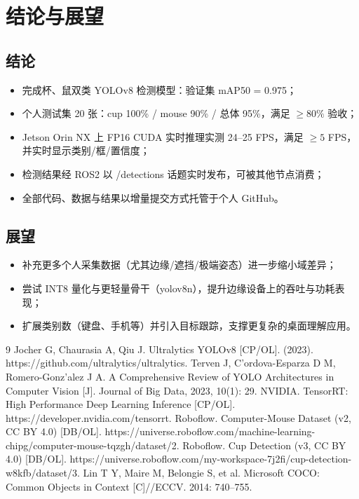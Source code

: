 \documentclass[UTF8,a4paper,zihao=-4]{ctexart}
\begin{document}
\section{结论与展望}
\subsection{结论}
\begin{itemize}
  \item 完成杯、鼠双类 YOLOv8 检测模型：验证集 mAP50 = 0.975；
  \item 个人测试集 20 张：cup 100\% / mouse 90\% / 总体 95\%，满足 $\geq 80\%$ 验收；
  \item Jetson Orin NX 上 FP16 CUDA 实时推理实测 24--25 FPS，满足 $\geq 5$ FPS，
        并实时显示类别/框/置信度；
  \item 检测结果经 ROS2 以 /detections 话题实时发布，可被其他节点消费；
  \item 全部代码、数据与结果以增量提交方式托管于个人 GitHub。
\end{itemize}
\subsection{展望}
\begin{itemize}
  \item 补充更多个人采集数据（尤其边缘/遮挡/极端姿态）进一步缩小域差异；
  \item 尝试 INT8 量化与更轻量骨干（yolov8n），提升边缘设备上的吞吐与功耗表现；
  \item 扩展类别数（键盘、手机等）并引入目标跟踪，支撑更复杂的桌面理解应用。
\end{itemize}

\begin{thebibliography}{9}
   Jocher G, Chaurasia A, Qiu J. Ultralytics YOLOv8
    [CP/OL]. (2023). https://github.com/ultralytics/ultralytics.
   Terven J, C'ordova-Esparza D M, Romero-Gonz'alez J A.
    A Comprehensive Review of YOLO Architectures in Computer Vision
    [J]. Journal of Big Data, 2023, 10(1): 29.
   NVIDIA. TensorRT: High Performance Deep Learning Inference
    [CP/OL]. https://developer.nvidia.com/tensorrt.
   Roboflow. Computer-Mouse Dataset (v2, CC BY 4.0)
    [DB/OL]. https://universe.roboflow.com/machine-learning-chipg/computer-mouse-tqzgh/dataset/2.
   Roboflow. Cup Detection (v3, CC BY 4.0) [DB/OL].
    https://universe.roboflow.com/my-workspace-7j2fi/cup-detection-w8kfb/dataset/3.
   Lin T Y, Maire M, Belongie S, et al. Microsoft COCO: Common
    Objects in Context [C]//ECCV. 2014: 740--755.
\end{thebibliography}
\end{document}
